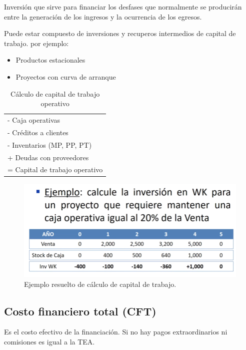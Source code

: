 \documentclass[twocolumn,10pt]{article}
\begin{document}
Inversión que sirve para financiar los desfases que normalmente se producirán entre la generación de los ingresos y la ocurrencia de los egresos.

Puede estar compuesto de inversiones y recuperos intermedios de capital de trabajo. por ejemplo:

\begin{itemize}
	\item Productos estacionales
	\item Proyectos con curva de arranque
\end{itemize}

\begin{table}[h]
	\centering
	\begin{tabular}{|l|} \hline
		- Caja operativas \\
		- Créditos a clientes \\
		- Inventarios (MP, PP, PT) \\ \hline
		+ Deudas con proveedores    \\ \hline
		= Capital de trabajo operativo \\ \hline
	\end{tabular}
\caption{Cálculo de capital de trabajo operativo}
\end{table}




\begin{figure}[htb]
	\centering
	\includegraphics[width=1\linewidth]{fig/working_capital_example.png}
	\caption{Ejemplo resuelto de cálculo de capital de trabajo.}
	\label{fig:working_capital_example}
\end{figure}



\subsection{Costo financiero total (CFT)}

Es el costo efectivo de la financiación. Si no hay pagos extraordinarios ni comisiones es igual a la TEA.
\end{document}

